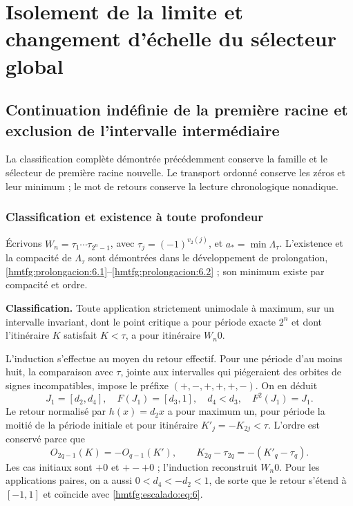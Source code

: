 \section{Isolement de la limite et changement d’échelle du sélecteur global}
\label{hmtfg:fragmento:aislamiento-del-limite-y-escalado-del-selector-global}

\subsection{Continuation indéfinie de la première racine et exclusion de l’intervalle intermédiaire}
\label{hmtfg:escalado:15}

La classification complète démontrée précédemment conserve la famille et le sélecteur de première racine nouvelle. Le transport ordonné conserve les zéros et leur minimum ; le mot de retours conserve la lecture chronologique nonadique.

\subsubsection{Classification et existence à toute profondeur}
\label{hmtfg:escalado:15.1}

Écrivons \(W_n=\tau_1\cdots\tau_{2^n-1}\), avec \(\tau_j=(-1)^{v_2(j)}\), et \(a_*=\min\Lambda_\tau\). L’existence et la compacité de \(\Lambda_\tau\) sont démontrées dans le développement de prolongation, \ref{hmtfg:prolongacion:6.1}–\ref{hmtfg:prolongacion:6.2} ; son minimum existe par compacité et ordre.

\textbf{Classification.} Toute application strictement unimodale à maximum, sur un intervalle invariant, dont le point critique a pour période exacte \(2^n\) et dont l’itinéraire \(K\) satisfait \(K<\tau\), a pour itinéraire \(W_n0\).

L’induction s’effectue au moyen du retour effectif. Pour une période d’au moins huit, la comparaison avec \(\tau\), jointe aux intervalles qui piégeraient des orbites de signes incompatibles, impose le préfixe \((+,-,+,+,+,-)\). On en déduit
\[
J_1=[d_2,d_4],\quad F(J_1)=[d_3,1],\quad
d_4<d_3,\quad F^2(J_1)=J_1.
\]
Le retour normalisé par \(h(x)=d_2x\) a pour maximum un, pour période la moitié de la période initiale et pour itinéraire \(K'_j=-K_{2j}<\tau\). L’ordre est conservé parce que
\[
O_{2q-1}(K)=-O_{q-1}(K'),\qquad
K_{2q}-\tau_{2q}=-(K'_q-\tau_q).
\]
Les cas initiaux sont \(+0\) et \(+-+0\) ; l’induction reconstruit \(W_n0\). Pour les applications paires, on a aussi \(0<d_4<-d_2<1\), de sorte que le retour s’étend à \([-1,1]\) et coïncide avec \eqref{hmtfg:escalado:eq:6}.


